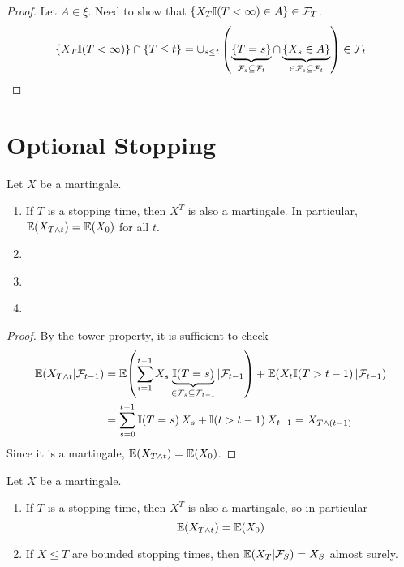 \begin{proof}
  Let $A \in \xi$.  Need to show that $\{ X_{T} \I{T < \infty} \in A
  \} \in \mathcal{F}_{T}$.
  \begin{align}
    \label{eq:25}
    \{ X_{T} \I{T < \infty} \} \cap \{ T \leq t \} = \cup_{s \leq t}
    \left( \underbrace{\{ T = s \}}_{\mathcal{F}_{s} \subseteq
        \mathcal{F}_{t}} \cap \underbrace{\{ X_{s} \in A \}}_{\in
        \mathcal{F}_{s} \subseteq \mathcal{F}_{t}} \right) \in \mathcal{F}_{t}
  \end{align}
\end{proof}


\section{Optional Stopping}
\label{sec:optional-stopping}

\begin{thm}
  \label{defn:discrete_time_martingales:6}
  Let $X$ be a martingale.
  \begin{enumerate}
  \item \label{item:1} If $T$ is a stopping time, then $X^{T}$ is also a martingale.
    In particular, $\E{X_{T \wedge t}} = \E{X_{0}}$ for all $t$.
  \item \label{item:2}
  \item \label{item:3}
  \item \label{item:4}
  \end{enumerate}
\end{thm}

\begin{proof}
  By the tower property, it is sufficient to check
  \begin{align*}
    \label{eq:26}
    \E{X_{T \wedge t} | \mathcal{F}_{t - 1}} &= 
    \E{\sum_{i=1}^{t-1} X_{s} \underbrace{\I{T=s}}_{\in
        \mathcal{F}_{s} \subseteq \mathcal{F}_{t-1}}  |
      \mathcal{F}_{t-1}} + \E{X_{t} \I{T > t -1} | \mathcal{F}_{t-1}}
    \\
    &= \sum_{s=0}^{t-1} \I{T=s} X_{s} + \I{t>t-1}X_{t-1} = X_{T \wedge (t-1)}
  \end{align*}  Since it is a martingale, $\E{X_{T \wedge t}} = \E{X_{0}}$.
\end{proof}

\begin{thm}
  \label{defn:discrete_time_martingales:7}
  Let $X$ be a martingale.
  \begin{enumerate}
  \item If $T$ is a stopping time, then $X^{T}$ is also a martingale,
    so in particular
    \begin{equation}
      \label{eq:27}
      \E{X_{T \wedge t}} = \E{X_{0}}
    \end{equation}
  \item If $X \leq T$ are bounded stopping times, then $\E{X_{T}|
      \mathcal{F}_{S}} = X_{S}$ almost surely.
  \end{enumerate}
\end{thm}

